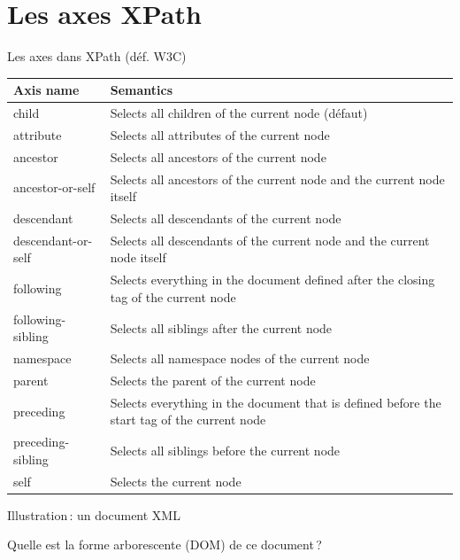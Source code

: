 

\section{Les axes XPath}

\begin{frame}{Les axes dans XPath (déf. W3C)}

\begin{tabular}{| l | p{8cm} |}
\hline
Axis name & Semantics \\
\hline
\hline
child & Selects all children of the current node (défaut)\\
\hline
attribute & Selects all attributes of the current node \\
\hline
ancestor & Selects all ancestors of the current node \\
\hline
ancestor-or-self & Selects all ancestors of the current node and the current node itself \\
\hline
descendant & Selects all descendants  of the current node \\
\hline
descendant-or-self & Selects all descendants of the current node and the current node itself \\
\hline
following & Selects everything in the document defined after the closing tag of the current node \\
\hline
following-sibling & Selects all siblings after the current node \\
\hline
namespace & Selects all namespace nodes of the current node \\
\hline
parent & Selects the parent of the current node \\
\hline
preceding & Selects everything in the document that is defined before the start tag of the current node \\
\hline
preceding-sibling & Selects all siblings before the current node \\
\hline
self & Selects the current node \\
\hline
\end{tabular}

\end{frame}



\begin{frame}{Illustration\,: un document XML}




\begin{exoblock}
Quelle est la forme arborescente (DOM) de ce document\,?
\end{exoblock}

\end{frame}


